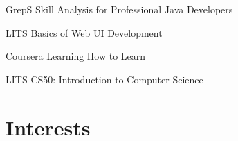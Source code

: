 \documentclass[a4paper, serif, 11pt]{moderncv}
\begin{document}
        {GrepS}
        {Skill Analysis for Professional Java Developers}
        {}
        {}
        {}

        {LITS}
        {Basics of Web UI Development}
        {}
        {}
        {}

        {Coursera}
        {Learning How to Learn}
        {}
        {}
        {}

        {LITS}
        {CS50: Introduction to Computer Science}
        {}
        {}
        {}
\section{Interests}

\end{document}
